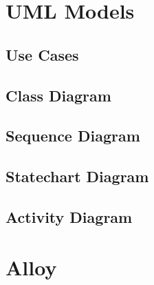 \documentclass[11pt,a4paper]{report}
\begin{document}
\section{UML Models}
\subsection{Use Cases}
\subsection{Class Diagram}
\subsection{Sequence Diagram}
\subsection{Statechart Diagram}
\subsection{Activity Diagram}
\section{Alloy}
\end{document}
